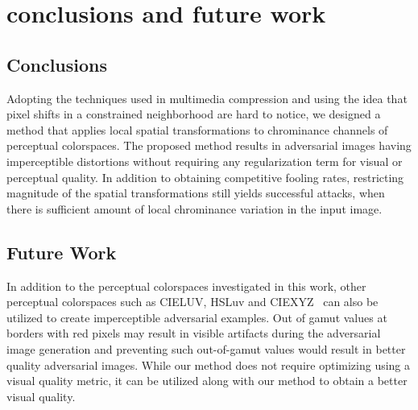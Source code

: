 \chapter{conclusions and future work}
\label{chp:6_conclusion}
\section{Conclusions}
Adopting the techniques used in multimedia compression and using the idea that pixel shifts in a constrained neighborhood are hard to notice, we designed a method that applies local spatial transformations to chrominance channels of perceptual colorspaces. The proposed method results in adversarial images having imperceptible distortions without requiring any regularization term for visual or perceptual quality. In addition to obtaining competitive fooling rates, restricting magnitude of the spatial transformations still yields successful attacks, when there is sufficient amount of local chrominance variation in the input image.

\section{Future Work}
In addition to the perceptual colorspaces investigated in this work, other perceptual colorspaces such as CIELUV, HSLuv and CIEXYZ~\cite{schanda2007colorimetry} can also be utilized to create imperceptible adversarial examples. Out of gamut values at borders with red pixels may result in visible artifacts during the adversarial image generation and preventing such out-of-gamut values would result in better quality adversarial images. While our method does not require optimizing using a visual quality metric, it can be utilized along with our method to obtain a better visual quality.
